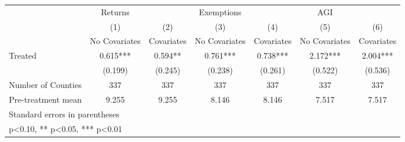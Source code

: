 {
\def\sym#1{\ifmmode^{#1}\else\(^{#1}\)\fi}
\begin{tabular}{l*{6}{c}}
\hline\hline
            &     Returns   &               &  Exemptions   &               &         AGI   &               \\
            &\multicolumn{1}{c}{(1)}&\multicolumn{1}{c}{(2)}&\multicolumn{1}{c}{(3)}&\multicolumn{1}{c}{(4)}&\multicolumn{1}{c}{(5)}&\multicolumn{1}{c}{(6)}\\
            &\multicolumn{1}{c}{No Covariates}&\multicolumn{1}{c}{Covariates}&\multicolumn{1}{c}{No Covariates}&\multicolumn{1}{c}{Covariates}&\multicolumn{1}{c}{No Covariates}&\multicolumn{1}{c}{Covariates}\\
\hline
Treated     &       0.615***&       0.594** &       0.761***&       0.738***&       2.172***&       2.004***\\
            &     (0.199)   &     (0.245)   &     (0.238)   &     (0.261)   &     (0.522)   &     (0.536)   \\
\hline
Number of Counties&         337   &         337   &         337   &         337   &         337   &         337   \\
Pre-treatment mean&       9.255   &       9.255   &       8.146   &       8.146   &       7.517   &       7.517   \\
\hline\hline
\multicolumn{7}{l}{\footnotesize Standard errors in parentheses}\\
\multicolumn{7}{l}{\footnotesize * p<0.10, ** p<0.05, *** p<0.01}\\
\end{tabular}
}
